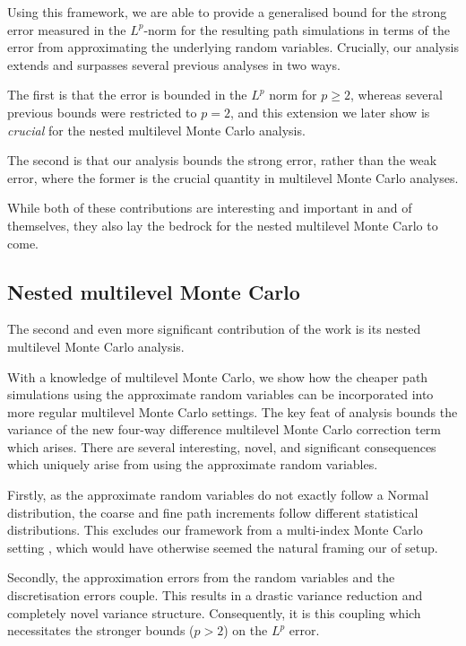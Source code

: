 \documentclass[twocolumn,10pt]{extarticle}
\begin{document}
Using this framework, we are able to provide a generalised bound for the strong error measured in the $ L^p $-norm for the resulting path simulations in terms of the error from approximating the underlying random variables. Crucially, our analysis extends and surpasses several previous analyses in two ways. 

The first is that the error is bounded in the $ L^p $ norm for $ p \geq 2 $, whereas several previous bounds were restricted to $ p = 2 $, and this extension we later show is \emph{crucial} for the nested multilevel Monte Carlo analysis. 

The second is that our analysis bounds the strong error, rather than the weak error, where the former is the crucial quantity in multilevel Monte Carlo analyses. 

While both of these contributions are interesting and important in and of themselves, they also lay the bedrock for the nested multilevel Monte Carlo to come.

\subsection{Nested multilevel Monte Carlo}

The second and even more significant contribution of the work is its nested multilevel Monte Carlo analysis. 

With a knowledge of multilevel Monte Carlo, we show how the cheaper path simulations using the approximate random variables can be incorporated into more regular multilevel Monte Carlo settings. The key feat of analysis bounds the variance of the new four-way difference multilevel Monte Carlo correction term which arises. There are several interesting, novel, and significant consequences which uniquely arise from using the approximate random variables. 

Firstly, as the approximate random variables do not exactly follow a Normal distribution, the coarse and fine path increments follow different statistical distributions. This excludes our framework from a multi-index Monte Carlo setting \citep{hnt16}, which would have otherwise seemed the natural framing our of setup. 

Secondly, the approximation errors from the random variables and the discretisation errors couple. This results in a drastic variance reduction and completely novel variance structure. Consequently, it is this coupling which necessitates the stronger bounds ($ p > 2 $) on the $ L^p $ error.
\end{document}
